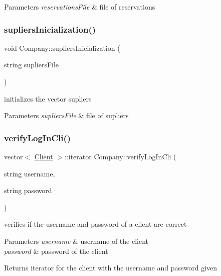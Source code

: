 \begin{DoxyParams}{Parameters}
{\em reservations\+File} & file of reservations \\
\hline
\end{DoxyParams}
\hypertarget{class_company_a5a3e5d5ef3ef991c54de2781d0607c19}{}\label{class_company_a5a3e5d5ef3ef991c54de2781d0607c19} 
\subsubsection{\texorpdfstring{supliers\+Inicialization()}{supliersInicialization()}}
{\footnotesize\ttfamily void Company\+::supliers\+Inicialization (\begin{DoxyParamCaption}\item[{string}]{supliers\+File }\end{DoxyParamCaption})}



initializes the vector supliers 


\begin{DoxyParams}{Parameters}
{\em supliers\+File} & file of supliers \\
\hline
\end{DoxyParams}
\hypertarget{class_company_ae09dab4c6a0d26207cdeffd0d5adcf8f}{}\label{class_company_ae09dab4c6a0d26207cdeffd0d5adcf8f} 
\subsubsection{\texorpdfstring{verify\+Log\+In\+Cli()}{verifyLogInCli()}}
{\footnotesize\ttfamily vector$<$ \hyperlink{class_client}{Client} $>$\+::iterator Company\+::verify\+Log\+In\+Cli (\begin{DoxyParamCaption}\item[{string}]{username,  }\item[{string}]{password }\end{DoxyParamCaption})}



verifies if the username and password of a client are correct 


\begin{DoxyParams}{Parameters}
{\em username} & username of the client\\
\hline
{\em password} & password of the client\\
\hline
\end{DoxyParams}
\begin{DoxyReturn}{Returns}
iterator for the client with the username and password given 
\end{DoxyReturn}
\hypertarget{class_company_a9012e0fa84141868a482a0a69b6313af}{}\label{class_company_a9012e0fa84141868a482a0a69b6313af} 

